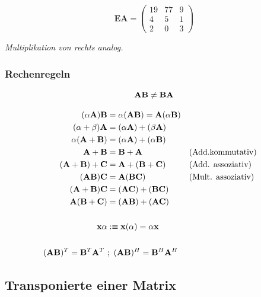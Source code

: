		\[
			\mathbf{EA} =
			\begin{pmatrix}
				19 & 77 & 9 \\
				4 & 5 & 1 \\
				2 & 0 & 3
			\end{pmatrix}
		\]
		
		\textit{Multiplikation von rechts analog.}
		
		\subsubsection{Rechenregeln}
		
		\begin{frules}%
			
			\[
				\mathbf{A} \mathbf{B} \not= \mathbf{B} \mathbf{A}
			\]
			
			
			\begin{align*}
				(\alpha \mathbf{A})\mathbf{B} & = \alpha (\mathbf{A} \mathbf{B}) = \mathbf{A}(\alpha \mathbf{B}) \\
				(\alpha + \beta)\mathbf{A} & = (\alpha \mathbf{A}) + (\beta \mathbf{A}) \\
				\alpha(\mathbf{A} + \mathbf{B}) & = (\alpha \mathbf{A}) + (\alpha \mathbf{B}) \\
				\mathbf{A} + \mathbf{B} &= \mathbf{B} + \mathbf{A} &&\text{(Add.kommutativ)}\\
				(\mathbf{A} + \mathbf{B}) + \mathbf{C} & = \mathbf{A} + (\mathbf{B} + \mathbf{C}) &&\text{(Add. assoziativ)}\\
				(\mathbf{A} \mathbf{B})\mathbf{C} & = \mathbf{A} (\mathbf{B} \mathbf{C}) &&\text{(Mult. assoziativ)}\\
				(\mathbf{A} + \mathbf{B})\mathbf{C} & = (\mathbf{A} \mathbf{C}) + (\mathbf{B} \mathbf{C}) \\
				\mathbf{A}(\mathbf{B} + \mathbf{C}) & = (\mathbf{A} \mathbf{B}) + (\mathbf{A} \mathbf{C}) \\
				\\
				\mathbf{x} \alpha & :\equiv \mathbf{x}(\alpha) = \alpha \mathbf{x} \\
				\\
				(\mathbf{A} \mathbf{B})^T = \mathbf{B}^T \mathbf{A}^T \ &; \ (\mathbf{A} \mathbf{B})^H = \mathbf{B}^H \mathbf{A}^H
			\end{align*}
	
		\end{frules}
	
	
	\subsection{Transponierte einer Matrix}
	
